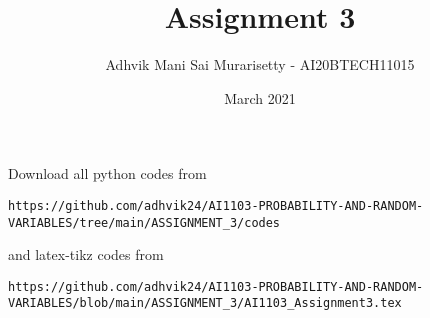 \documentclass[journal,12pt,twocolumn]{IEEEtran}
\date{March 2021}
\DeclareMathOperator*{\Res}{Res}
\begin{document}
\newcommand{\BEQA}{\begin{eqnarray}}
\newcommand{\EEQA}{\end{eqnarray}}
\newcommand{\define}{\stackrel{\triangle}{=}}

\raggedbottom
\setlength{\parindent}{0pt}
\providecommand{\mbf}{\mathbf}
\providecommand{\pr}[1]{\ensuremath{\Pr\left(#1\right)}}
\providecommand{\qfunc}[1]{\ensuremath{Q\left(#1\right)}}
\providecommand{\fn}[1]{\ensuremath{f\left(#1\right)}}
\providecommand{\e}[1]{\ensuremath{E\left(#1\right)}}
\providecommand{\sbrak}[1]{\ensuremath{{}\left[#1\right]}}
\providecommand{\lsbrak}[1]{\ensuremath{{}\left[#1\right.}}
\providecommand{\rsbrak}[1]{\ensuremath{{}\left.#1\right]}}
\providecommand{\brak}[1]{\ensuremath{\left(#1\right)}}
\providecommand{\lbrak}[1]{\ensuremath{\left(#1\right.}}
\providecommand{\rbrak}[1]{\ensuremath{\left.#1\right)}}
\providecommand{\cbrak}[1]{\ensuremath{\left\{#1\right\}}}
\providecommand{\lcbrak}[1]{\ensuremath{\left\{#1\right.}}
\providecommand{\rcbrak}[1]{\ensuremath{\left.#1\right\}}}
\theoremstyle{remark}
\newtheorem{rem}{Remark}
\newcommand{\sgn}{\mathop{\mathrm{sgn}}}
\providecommand{\abs}[1]{\vert#1\vert}
\providecommand{\res}[1]{\Res\displaylimits_{#1}} 
\providecommand{\norm}[1]{\lVert#1\rVert}
\providecommand{\mtx}[1]{\mathbf{#1}}
\providecommand{\mean}[1]{E[ #1 ]}
\providecommand{\fourier}{\overset{\mathcal{F}}{ \rightleftharpoons}}
\providecommand{\system}{\overset{\mathcal{H}}{ \longleftrightarrow}}
\newcommand{\solution}{\noindent \textbf{Solution: }}
\newcommand{\cosec}{\,\text{cosec}\,}
\providecommand{\dec}[2]{\ensuremath{\overset{#1}{\underset{#2}{\gtrless}}}}
\newcommand{\myvec}[1]{\ensuremath{\begin{pmatrix}#1\end{pmatrix}}}
\newcommand{\mydet}[1]{\ensuremath{\begin{vmatrix}#1\end{vmatrix}}}
\makeatletter
\vspace{3cm}
\title{Assignment 3}
\author{Adhvik Mani Sai Murarisetty - AI20BTECH11015}
\maketitle
\newpage
\bigskip
\renewcommand{\thetable}{\theenumi}
Download all python codes from 
\begin{lstlisting}
https://github.com/adhvik24/AI1103-PROBABILITY-AND-RANDOM-VARIABLES/tree/main/ASSIGNMENT_3/codes
\end{lstlisting}
%
and latex-tikz codes from 
%
\begin{lstlisting}
https://github.com/adhvik24/AI1103-PROBABILITY-AND-RANDOM-VARIABLES/blob/main/ASSIGNMENT_3/AI1103_Assignment3.tex
\end{lstlisting}
\end{document}
